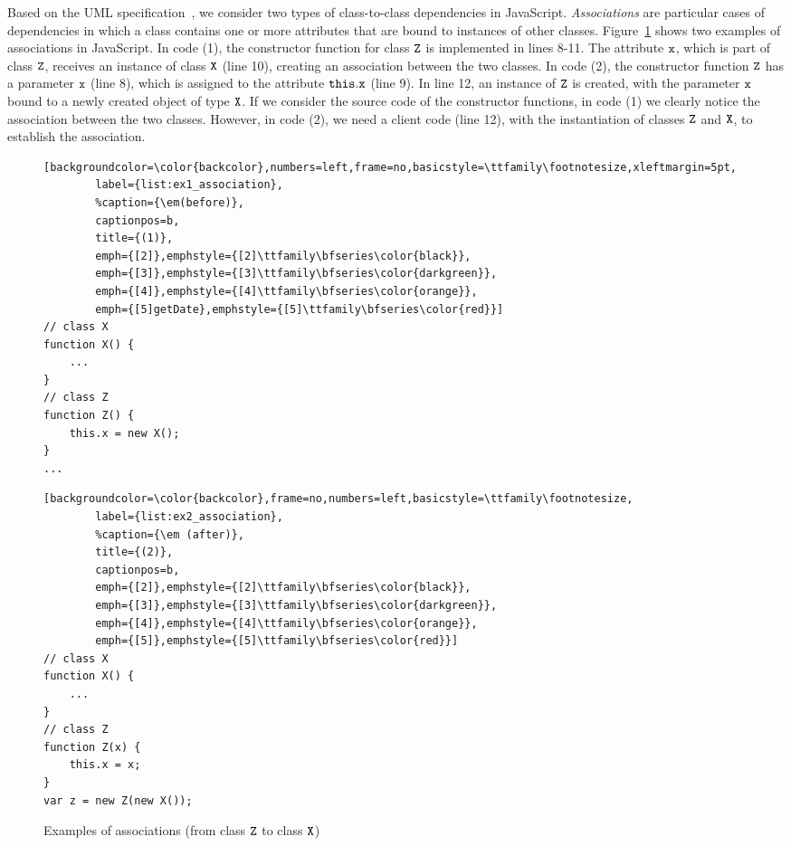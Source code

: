 \documentclass[review]{elsarticle}
\newcommand{\mcode}[1]{$\tt #1$}
\begin{document}
Based on the UML specification~\cite{Fowler2003}, we consider two types of class-to-class dependencies in JavaScript. \textit{Associations} are particular cases of dependencies in which a class contains one or more attributes that are bound to instances of other classes. Figure~\ref{fig:example-associations} shows two examples of associations in JavaScript. In code (1), the constructor function for class \mcode{Z} is implemented in lines 8-11. The attribute \mcode{x}, which is part of class \mcode{Z}, receives an instance of class \mcode{X} (line 10), creating an association between the two classes. In code (2), the constructor function \mcode{Z} has a parameter \mcode{x} (line 8), which is assigned to the attribute \mcode{this.x} (line 9). In line 12, an instance of \mcode{Z} is created, with the parameter \mcode{x} bound to a newly created object of type \mcode{X}. If we consider the source code of the constructor functions, in code (1) we clearly notice the association between the two classes. However, in code (2), we need a client code (line 12), with the instantiation of classes \mcode{Z} and \mcode{X}, to establish the association.

\begin{figure}[ht]
	\centering
	\begin{minipage}{.35\textwidth}
		\begin{lstlisting}[backgroundcolor=\color{backcolor},numbers=left,frame=no,basicstyle=\ttfamily\footnotesize,xleftmargin=5pt,
		label={list:ex1_association},
		%caption={\em(before)},
		captionpos=b,
		title={(1)},
		emph={[2]},emphstyle={[2]\ttfamily\bfseries\color{black}},
		emph={[3]},emphstyle={[3]\ttfamily\bfseries\color{darkgreen}},
		emph={[4]},emphstyle={[4]\ttfamily\bfseries\color{orange}},
		emph={[5]getDate},emphstyle={[5]\ttfamily\bfseries\color{red}}]
// class X 
function X() {
	...
}
// class Z 
function Z() {
	this.x = new X();
}
...		
		\end{lstlisting}
	\end{minipage}
	\hspace{1pt}
	\begin{minipage}{.40\textwidth}
		\begin{lstlisting}[backgroundcolor=\color{backcolor},frame=no,numbers=left,basicstyle=\ttfamily\footnotesize,
		label={list:ex2_association},
		%caption={\em (after)},
		title={(2)},
		captionpos=b,
		emph={[2]},emphstyle={[2]\ttfamily\bfseries\color{black}},
		emph={[3]},emphstyle={[3]\ttfamily\bfseries\color{darkgreen}},
		emph={[4]},emphstyle={[4]\ttfamily\bfseries\color{orange}},
		emph={[5]},emphstyle={[5]\ttfamily\bfseries\color{red}}]
// class X 
function X() {
	...
}
// class Z
function Z(x) {
	this.x = x;
}
var z = new Z(new X());
		\end{lstlisting}
	\end{minipage}
	
	\caption{Examples of associations (from class \mcode{Z} to class \mcode{X})}
	\label{fig:example-associations}
\end{figure}
\end{document}
